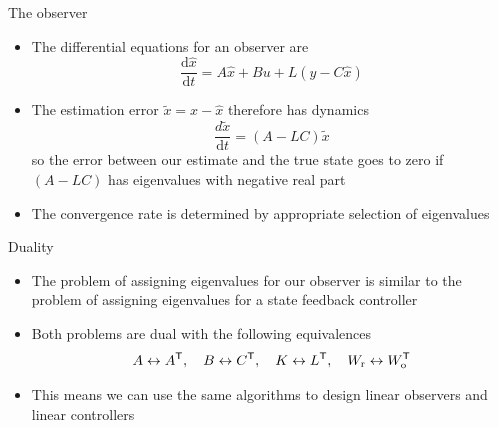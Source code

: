 \documentclass[10pt]{beamer-control}
\begin{document}
\begin{frame}{The observer}
  \begin{itemize}
    \item The differential equations for an observer are
      \begin{equation}
        \frac{\mathrm{d}\hat{x}}{\mathrm{d}t} = A\hat{x}+Bu+L(y-C\hat{x})
      \end{equation}
    \item The estimation error $\tilde{x}=x-\hat{x}$ therefore has dynamics
      \begin{equation}
        \frac{d\tilde{x}}{\mathrm{d}t} = (A-LC)\tilde{x}
      \end{equation}
      so the error between our estimate and the true state goes to zero if $(A-LC)$ has eigenvalues with negative real part
    \item The convergence rate is determined by appropriate selection of eigenvalues
  \end{itemize}
\end{frame}

\begin{frame}{Duality}
  \begin{itemize}
    \item The problem of assigning eigenvalues for our observer is similar to the problem of assigning eigenvalues for a state feedback controller
    \item Both problems are \alert{dual} with the following equivalences
      \begin{equation}
        A \leftrightarrow A^{\mathsf T}, \quad B \leftrightarrow C^{\mathsf T}, \quad K \leftrightarrow L^{\mathsf T}, \quad W_{\mathrm{r}} \leftrightarrow W_{\mathrm{o}}^{\mathsf T}
      \end{equation}
    \item This means we can use the same algorithms to design  linear observers and linear controllers
  \end{itemize}
\end{frame}
\end{document}
